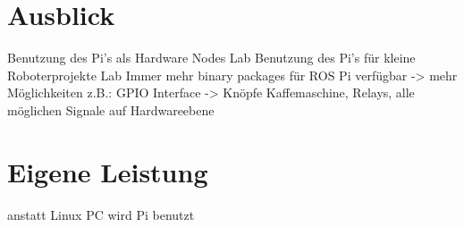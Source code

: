 \documentclass[12pt]{article}
\begin{document}
\section{Ausblick}

Benutzung des Pi's als Hardware Nodes Lab
Benutzung des Pi's für kleine Roboterprojekte Lab
Immer mehr binary packages für ROS Pi verfügbar -> mehr Möglichkeiten
z.B.: GPIO Interface -> Knöpfe Kaffemaschine, Relays, alle möglichen Signale
auf Hardwareebene

\section{Eigene Leistung}

anstatt Linux PC wird Pi benutzt
\end{document}
